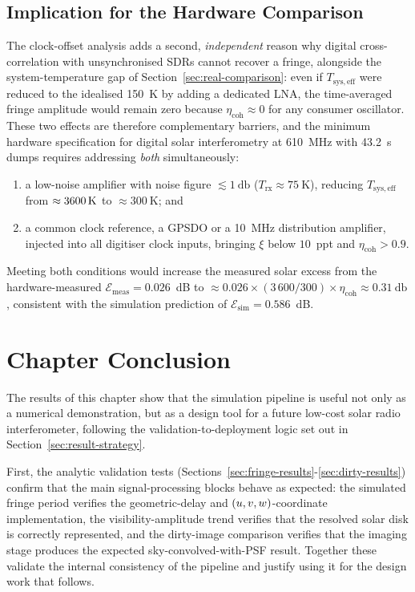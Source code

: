 \subsection{Implication for the Hardware Comparison}

The clock-offset analysis adds a second, \emph{independent} reason why digital
cross-correlation with unsynchronised SDRs cannot recover a fringe, alongside the
system-temperature gap of Section~\ref{sec:real-comparison}: even if
$T_{\mathrm{sys,eff}}$ were reduced to the idealised \SI{150}{\kelvin} by adding a
dedicated LNA, the time-averaged fringe amplitude would remain zero because
$\eta_{\mathrm{coh}}\approx0$ for any consumer oscillator. These two effects are
therefore complementary barriers, and the minimum hardware specification for digital
solar interferometry at \SI{610}{\mega\hertz} with \SI{43.2}{\second} dumps requires
addressing \emph{both} simultaneously:
\begin{enumerate}[leftmargin=1.8em]
  \item a low-noise amplifier with noise figure $\lesssim\SI{1}{\decibel}$
        ($T_{\mathrm{rx}}\approx\SI{75}{\kelvin}$), reducing
        $T_{\mathrm{sys,eff}}$ from $\approx\SI{3\,600}{\kelvin}$ to
        $\approx\SI{300}{\kelvin}$; and
  \item a common clock reference, a GPSDO or a \SI{10}{\mega\hertz}
        distribution amplifier, injected into all digitiser clock inputs,
        bringing $\xi$ below $10$~ppt and
        $\eta_{\mathrm{coh}}>0.9$.
\end{enumerate}
Meeting both conditions would increase the measured solar excess from the
hardware-measured $\mathcal{E}_{\mathrm{meas}}=0.026$~dB to
$\approx0.026\times(3\,600/300)\times\eta_{\mathrm{coh}}
\approx\SI{0.31}{\decibel}$, consistent with the simulation prediction of
$\mathcal{E}_{\mathrm{sim}}=0.586$~dB.

\section{Chapter Conclusion}

The results of this chapter show that the simulation pipeline is useful not only as a
numerical demonstration, but as a design tool for a future low-cost solar radio
interferometer, following the validation-to-deployment logic set out in
Section~\ref{sec:result-strategy}.

First, the analytic validation tests (Sections~\ref{sec:fringe-results}-\ref{sec:dirty-results})
confirm that the main signal-processing blocks behave as expected: the simulated
fringe period verifies the geometric-delay and $(u,v,w)$-coordinate implementation, the
visibility-amplitude trend verifies that the resolved solar disk is correctly
represented, and the dirty-image comparison verifies that the imaging stage produces
the expected sky-convolved-with-PSF result. Together these validate the internal
consistency of the pipeline and justify using it for the design work that follows.

